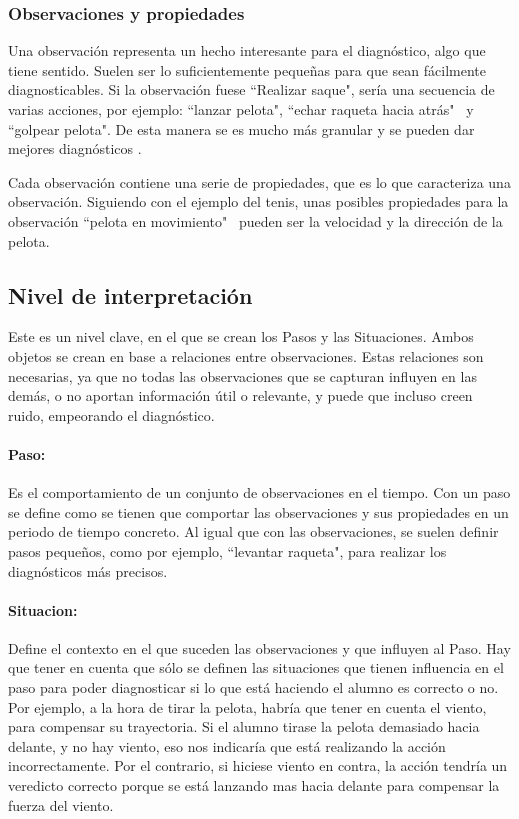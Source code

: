 \subsubsection{Observaciones y propiedades}
Una observaci\'on representa un hecho interesante para el diagn\'ostico, algo que tiene sentido. Suelen
ser lo suficientemente peque\~nas para que sean f\'acilmente diagnosticables. Si la observaci\'on
fuese ``Realizar saque", ser\'ia una secuencia de varias acciones, por ejemplo: ``lanzar pelota", ``echar raqueta hacia atr\'as" \
y ``golpear pelota". De esta manera se es mucho m\'as granular y se pueden dar mejores diagn\'osticos \cite{INTRASIM:Manual}.

Cada observaci\'on contiene una serie de propiedades, que es lo que caracteriza una observaci\'on. 
Siguiendo con el ejemplo del tenis, unas posibles propiedades para la observaci\'on ``pelota en movimiento" \
pueden ser la velocidad y la direcci\'on de la pelota.

\subsection{Nivel de interpretaci\'on}
Este es un nivel clave, en el que se crean los Pasos y las Situaciones. Ambos objetos se crean en base a relaciones
entre observaciones.
Estas relaciones son necesarias, ya que no todas las observaciones que se capturan influyen en las dem\'as,
o no aportan informaci\'on \'util o relevante, y puede que incluso creen ruido, empeorando el diagn\'ostico.

\paragraph{\textbf{Paso:}}
Es el comportamiento de un conjunto de observaciones en el tiempo. Con un paso se define como se tienen
que comportar las observaciones y sus propiedades en un periodo de tiempo concreto. Al igual que con las observaciones,
se suelen definir pasos peque\~nos, como por ejemplo, ``levantar raqueta", para realizar los diagn\'osticos m\'as precisos.

\paragraph{\textbf{Situacion:}}
Define el contexto en el que suceden las observaciones y que influyen al Paso. Hay que
tener en cuenta que s\'olo se definen las situaciones que tienen influencia en el paso
para poder diagnosticar si lo que est\'a haciendo el alumno es correcto o no. Por ejemplo, a la hora
de tirar la pelota, habr\'ia que tener en cuenta el viento, para compensar su trayectoria. Si el alumno
tirase la pelota demasiado hacia delante, y no hay viento, eso nos indicar\'ia que est\'a realizando la acci\'on
incorrectamente. Por el contrario, si hiciese viento en contra, la acci\'on tendr\'ia un veredicto correcto
porque se est\'a lanzando mas hacia delante para compensar la fuerza del viento.

